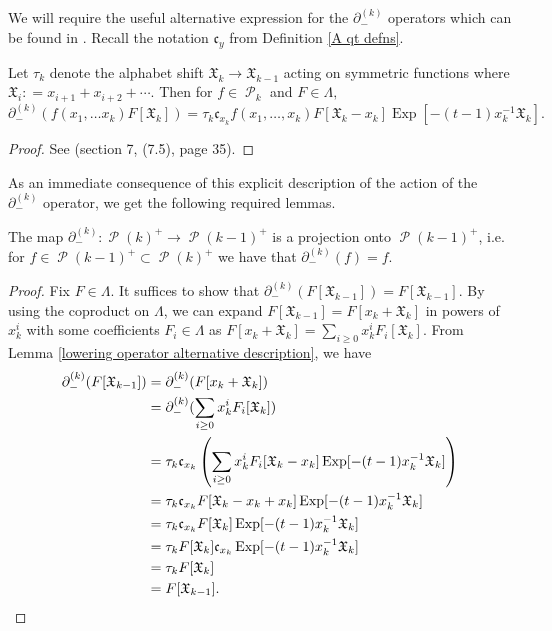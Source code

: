 \documentclass[ALCO,Unicode]{cedram}
\DeclareMathOperator{\sP}{\mathscr{P} }
\DeclareMathOperator{\EXP}{\mathrm{Exp}}
\begin{document}
We will require the useful alternative expression for the $\partial_{-}^{(k)}$ operators which can be found in \cite{Ion_2022}. Recall the notation $\mathfrak{c}_{y}$ from Definition \ref{A qt defns}.

\begin{lemm}\label{lowering operator alternative description}
Let $\tau_k$ denote the alphabet shift $\mathfrak{X}_k \rightarrow \mathfrak{X}_{k-1}$ acting on symmetric functions where $\mathfrak{X}_i : = x_{i+1}+x_{i+2}+ \cdots$. Then for $f \in \sP_{k}$ and $F \in \Lambda,$
$$ \partial_{-}^{(k)}(f(x_1,\ldots x_k) F[\mathfrak{X}_k]) = \tau_k \mathfrak{c}_{x_k} f(x_1,\ldots,x_k)F[\mathfrak{X}_k -x_k]\EXP[-(t-1)x_k^{-1}\mathfrak{X}_{k}].$$
\end{lemm}

\begin{proof}
See \cite{Ion_2022} (section 7, (7.5), page 35).
\end{proof}

As an immediate consequence of this explicit description of the action of the $\partial_{-}^{(k)}$ operator, we get the following required lemmas.

\begin{lemm} \label{lowering is a projection}
The map $\partial_{-}^{(k)}: \sP(k)^{+} \rightarrow \sP(k-1)^{+}$ is a projection onto $\sP(k-1)^{+}$, i.e. for $f \in \sP(k-1)^{+}\subset \sP(k)^{+}$ we have that $\partial_{-}^{(k)}(f) = f$.
\end{lemm}
\begin{proof}
    Fix $F \in \Lambda.$ It suffices to show that $\partial_{-}^{(k)}(F[\mathfrak{X}_{k-1}]) = F[\mathfrak{X}_{k-1}].$ By using the coproduct on $\Lambda$, we can expand $F[\mathfrak{X}_{k-1}] = F[x_k+\mathfrak{X}_{k}]$ in powers of $x_k^{i}$ with some coefficients $F_i \in \Lambda$ as $F[x_k+\mathfrak{X}_{k}] = \sum_{i \geq 0} x_k^{i}F_{i}[\mathfrak{X}_{k}].$ From Lemma \ref{lowering operator alternative description}, we have 
    \begin{align*}
        \partial_{-}^{(k)}(F[\mathfrak{X}_{k-1}]) &= \partial_{-}^{(k)}(F[x_{k}+\mathfrak{X}_{k}])\\
        &= \partial_{-}^{(k)}(\sum_{i \geq 0} x_k^{i}F_{i}[\mathfrak{X}_{k}]) \\
        &= \tau_k \mathfrak{c}_{x_k} \left( \sum_{i \geq 0} x_k^{i}F_i[\mathfrak{X}_k -x_k]\EXP[-(t-1)x_k^{-1}\mathfrak{X}_{k}] \right) \\
        &= \tau_k \mathfrak{c}_{x_k} F[\mathfrak{X}_k -x_k +x_k]\EXP[-(t-1)x_k^{-1}\mathfrak{X}_{k}] \\
        &= \tau_k \mathfrak{c}_{x_k} F[\mathfrak{X}_k] \EXP[-(t-1)x_k^{-1}\mathfrak{X}_{k}] \\ 
        &= \tau_k F[\mathfrak{X}_k] \mathfrak{c}_{x_k} \EXP[-(t-1)x_k^{-1}\mathfrak{X}_{k}] \\ 
        &= \tau_k F[\mathfrak{X}_k] \\
        &= F[\mathfrak{X}_{k-1}]. \qedhere
    \end{align*}
    
    
\end{proof}
\end{document}
